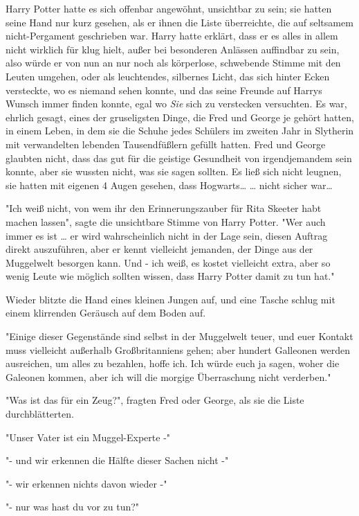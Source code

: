 {Harry Potter hatte es sich offenbar angewöhnt, unsichtbar zu sein; sie hatten seine Hand nur kurz gesehen, als er ihnen die Liste überreichte, die auf seltsamem nicht-Pergament geschrieben war. Harry hatte erklärt, dass er es alles in allem nicht wirklich für klug hielt, außer bei besonderen Anlässen auffindbar zu sein, also würde er von nun an nur noch als körperlose, schwebende Stimme mit den Leuten umgehen, oder als leuchtendes, silbernes Licht, das sich hinter Ecken versteckte, wo es niemand sehen konnte, und das seine Freunde auf Harrys Wunsch immer finden konnte, egal wo \emph{Sie} sich zu verstecken versuchten. Es war, ehrlich gesagt, eines der gruseligsten Dinge, die Fred und George je gehört hatten, in einem Leben, in dem sie die Schuhe jedes Schülers im zweiten Jahr in Slytherin mit verwandelten lebenden Tausendfüßlern gefüllt hatten. Fred und George glaubten nicht, dass das gut für die geistige Gesundheit von irgendjemandem sein konnte, aber sie wussten nicht, was sie sagen sollten. Es ließ sich nicht leugnen, sie hatten mit eigenen 4 Augen gesehen, dass Hogwarts… … nicht sicher war…

"Ich weiß nicht, von wem ihr den Erinnerungszauber für Rita Skeeter habt machen lassen", sagte die unsichtbare Stimme von Harry Potter. "Wer auch immer es ist … er wird wahrscheinlich nicht in der Lage sein, diesen Auftrag direkt auszuführen, aber er kennt vielleicht jemanden, der Dinge aus der Muggelwelt besorgen kann. Und - ich weiß, es kostet vielleicht extra, aber so wenig Leute wie möglich sollten wissen, dass Harry Potter damit zu tun hat."

Wieder blitzte die Hand eines kleinen Jungen auf, und eine Tasche schlug mit einem klirrenden Geräusch auf dem Boden auf.

"Einige dieser Gegenstände sind selbst in der Muggelwelt teuer, und euer Kontakt muss vielleicht außerhalb Großbritanniens gehen; aber hundert Galleonen werden ausreichen, um alles zu bezahlen, hoffe ich. Ich würde euch ja sagen, woher die Galeonen kommen, aber ich will die morgige Überraschung nicht verderben."

"Was ist das für ein Zeug?", fragten Fred oder George, als sie die Liste durchblätterten.

"Unser Vater ist ein Muggel-Experte -"

"- und wir erkennen die Hälfte dieser Sachen nicht -"

"- wir erkennen nichts davon wieder -"

"- nur was hast du vor zu tun?"

}
